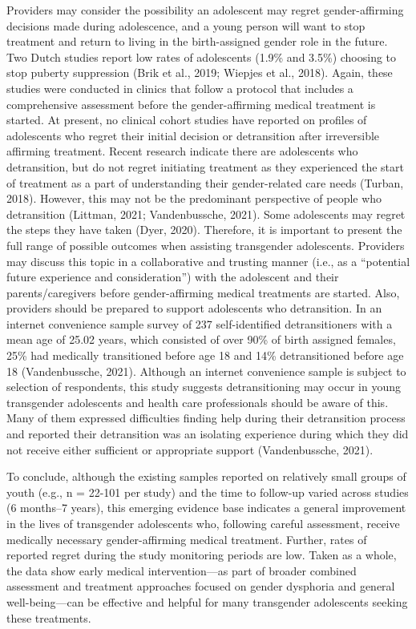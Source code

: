 \documentclass[
]{book}
\begin{document}
Providers may consider the possibility an adolescent may regret gender-affirming decisions
made during adolescence, and a young person
will want to stop treatment and return to living
in the birth-assigned gender role in the future.
Two Dutch studies report low rates of adolescents (1.9\% and 3.5\%) choosing to stop puberty
suppression (Brik et al., 2019; Wiepjes et al.,
2018). Again, these studies were conducted in
clinics that follow a protocol that includes a
comprehensive assessment before the
gender-affirming medical treatment is started.
At present, no clinical cohort studies have
reported on profiles of adolescents who regret
their initial decision or detransition after irreversible affirming treatment. Recent research
indicate there are adolescents who detransition,
but do not regret initiating treatment as they
experienced the start of treatment as a part of
understanding their gender-related care needs
(Turban, 2018). However, this may not be the
predominant perspective of people who
detransition (Littman, 2021; Vandenbussche,
2021). Some adolescents may regret the steps
they have taken (Dyer, 2020). Therefore, it is
important to present the full range of possible
outcomes when assisting transgender adolescents. Providers may discuss this topic in a collaborative and trusting manner (i.e., as a
``potential future experience and consideration'')
with the adolescent and their parents/caregivers
before gender-affirming medical treatments are
started. Also, providers should be prepared to
support adolescents who detransition. In an
internet convenience sample survey of 237
self-identified detransitioners with a mean age
of 25.02 years, which consisted of over 90\% of
birth assigned females, 25\% had medically transitioned before age 18 and 14\% detransitioned
before age 18 (Vandenbussche, 2021). Although
an internet convenience sample is subject to
selection of respondents, this study suggests
detransitioning may occur in young transgender
adolescents and health care professionals should
be aware of this. Many of them expressed difficulties finding help during their detransition
process and reported their detransition was an
isolating experience during which they did not
receive either sufficient or appropriate support
(Vandenbussche, 2021).

To conclude, although the existing samples
reported on relatively small groups of youth (e.g.,
n = 22-101 per study) and the time to follow-up
varied across studies (6 months--7 years), this
emerging evidence base indicates a general
improvement in the lives of transgender adolescents who, following careful assessment, receive
medically necessary gender-affirming medical
treatment. Further, rates of reported regret during
the study monitoring periods are low. Taken as
a whole, the data show early medical intervention---as part of broader combined assessment
and treatment approaches focused on gender dysphoria and general well-being---can be effective
and helpful for many transgender adolescents
seeking these treatments.
\end{document}
